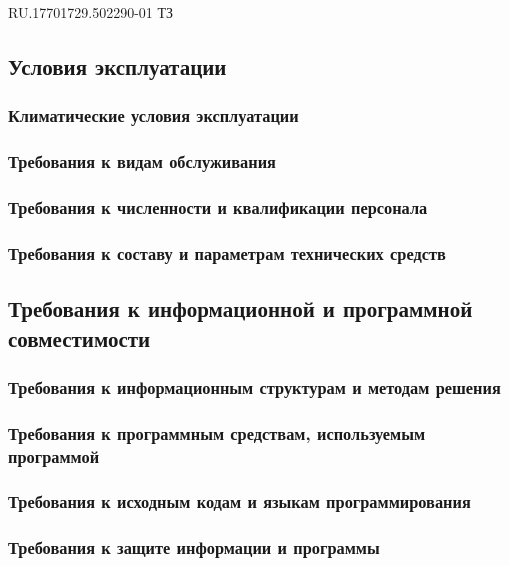 \begin{uspd}{RU.17701729.502290-01 ТЗ}
    

\subsection{Условия эксплуатации}

    \subsubsection{Климатические условия эксплуатации}

    
\subsubsection{Требования к видам обслуживания}

    
\subsubsection{Требования к численности и квалификации персонала}

    
\subsubsection{Требования к составу и параметрам технических средств}

    

\subsection{Требования к информационной и программной совместимости}

    \subsubsection{Требования к информационным структурам и методам решения}

    
\subsubsection{Требования к программным средствам, используемым программой}

    
\subsubsection{Требования к исходным кодам и языкам программирования}

    
\subsubsection{Требования к защите информации и программы}


\end{uspd}

